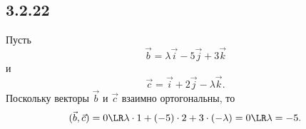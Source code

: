 \subsection{3.2.22}

Пусть
\[
\vec b=\lambda\vec i-5\vec j+3\vec k
\]
и
\[
\vec c=\vec i+2\vec j-\lambda\vec k.
\]
Поскольку векторы $\vec b$ и $\vec c$ взаимно ортогональны, то
\[
(\vec b,\vec c)=0\LR \lambda\cdot1+(-5)\cdot2+3\cdot(-\lambda)=0\LR\lambda=-5.
\]